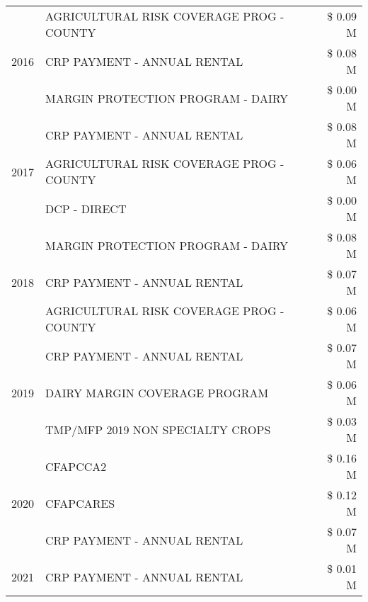 \begin{tabular}{llr}
\cline{1-3}
\multirow[t]{3}{*}{2016} & AGRICULTURAL RISK COVERAGE PROG - COUNTY & \$ 0.09 M \\
 & CRP PAYMENT - ANNUAL RENTAL & \$ 0.08 M \\
 & MARGIN PROTECTION PROGRAM - DAIRY & \$ 0.00 M \\
\cline{1-3}
\multirow[t]{3}{*}{2017} & CRP PAYMENT - ANNUAL RENTAL & \$ 0.08 M \\
 & AGRICULTURAL RISK COVERAGE PROG - COUNTY & \$ 0.06 M \\
 & DCP - DIRECT & \$ 0.00 M \\
\cline{1-3}
\multirow[t]{3}{*}{2018} & MARGIN PROTECTION PROGRAM - DAIRY & \$ 0.08 M \\
 & CRP PAYMENT - ANNUAL RENTAL & \$ 0.07 M \\
 & AGRICULTURAL RISK COVERAGE PROG - COUNTY & \$ 0.06 M \\
\cline{1-3}
\multirow[t]{3}{*}{2019} & CRP PAYMENT - ANNUAL RENTAL & \$ 0.07 M \\
 & DAIRY MARGIN COVERAGE PROGRAM & \$ 0.06 M \\
 & TMP/MFP 2019 NON SPECIALTY CROPS & \$ 0.03 M \\
\cline{1-3}
\multirow[t]{3}{*}{2020} & CFAPCCA2 & \$ 0.16 M \\
 & CFAPCARES & \$ 0.12 M \\
 & CRP PAYMENT - ANNUAL RENTAL & \$ 0.07 M \\
\cline{1-3}
2021 & CRP PAYMENT - ANNUAL RENTAL & \$ 0.01 M \\
\cline{1-3}
\bottomrule
\end{tabular}
